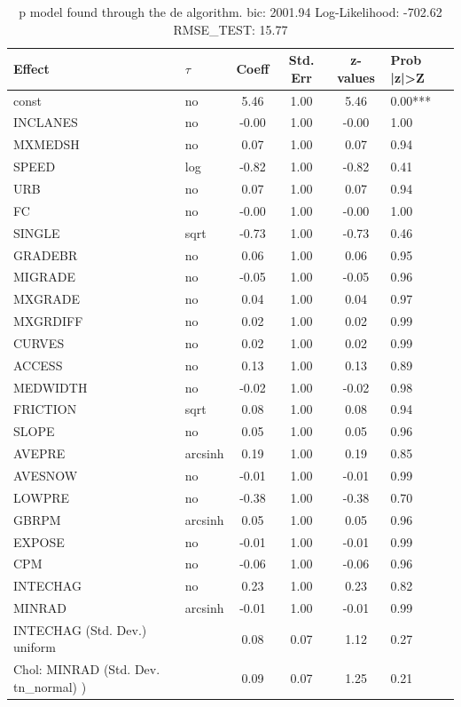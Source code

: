 \begin{table}
	\caption{p model found through the de algorithm. bic: 2001.94 Log-Likelihood: -702.62 RMSE_TEST: 15.77}
	\begin{center}
		\begin{tabular}{|l|l|c|c|c|l|}
			\hline
			Effect & $\tau$ & Coeff & Std. Err & z-values & Prob |z|>Z \\
			\hline
			const & no & 5.46 & 1.00 & 5.46 & 0.00*** \\
			\hline
			INCLANES & no & -0.00 & 1.00 & -0.00 & 1.00 \\
			\hline
			MXMEDSH & no & 0.07 & 1.00 & 0.07 & 0.94 \\
			\hline
			SPEED & log & -0.82 & 1.00 & -0.82 & 0.41 \\
			\hline
			URB & no & 0.07 & 1.00 & 0.07 & 0.94 \\
			\hline
			FC & no & -0.00 & 1.00 & -0.00 & 1.00 \\
			\hline
			SINGLE & sqrt & -0.73 & 1.00 & -0.73 & 0.46 \\
			\hline
			GRADEBR & no & 0.06 & 1.00 & 0.06 & 0.95 \\
			\hline
			MIGRADE & no & -0.05 & 1.00 & -0.05 & 0.96 \\
			\hline
			MXGRADE & no & 0.04 & 1.00 & 0.04 & 0.97 \\
			\hline
			MXGRDIFF & no & 0.02 & 1.00 & 0.02 & 0.99 \\
			\hline
			CURVES & no & 0.02 & 1.00 & 0.02 & 0.99 \\
			\hline
			ACCESS & no & 0.13 & 1.00 & 0.13 & 0.89 \\
			\hline
			MEDWIDTH & no & -0.02 & 1.00 & -0.02 & 0.98 \\
			\hline
			FRICTION & sqrt & 0.08 & 1.00 & 0.08 & 0.94 \\
			\hline
			SLOPE & no & 0.05 & 1.00 & 0.05 & 0.96 \\
			\hline
			AVEPRE & arcsinh & 0.19 & 1.00 & 0.19 & 0.85 \\
			\hline
			AVESNOW & no & -0.01 & 1.00 & -0.01 & 0.99 \\
			\hline
			LOWPRE & no & -0.38 & 1.00 & -0.38 & 0.70 \\
			\hline
			GBRPM & arcsinh & 0.05 & 1.00 & 0.05 & 0.96 \\
			\hline
			EXPOSE & no & -0.01 & 1.00 & -0.01 & 0.99 \\
			\hline
			CPM & no & -0.06 & 1.00 & -0.06 & 0.96 \\
			\hline
			INTECHAG & no & 0.23 & 1.00 & 0.23 & 0.82 \\
			\hline
			MINRAD & arcsinh & -0.01 & 1.00 & -0.01 & 0.99 \\
			\hline
			INTECHAG (Std. Dev.) uniform &  & 0.08 & 0.07 & 1.12 & 0.27 \\
			\hline
			 Chol: MINRAD (Std. Dev. tn_normal) ) &  & 0.09 & 0.07 & 1.25 & 0.21 \\
			\hline
		\end{tabular}
	\end{center}
\end{table}